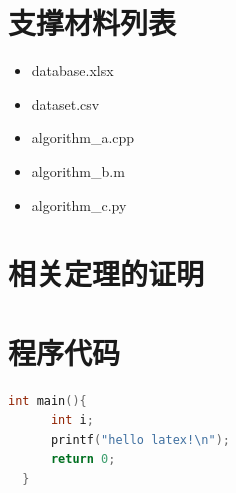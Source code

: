 
\begin{appendices}

\section{支撑材料列表}

\begin{itemize}\ttfamily
  \item{database.xlsx}
  \item{dataset.csv}
  \item{algorithm\_a.cpp}
  \item{algorithm\_b.m}
  \item{algorithm\_c.py}
\end{itemize}



\section{相关定理的证明}

\zhlipsum[2]


\section{程序代码}


\begin{lstlisting}[language=C++,title={\raggedright 基础程序}]
  int main(){
      int i;
      printf("hello latex!\n");
      return 0;
  }
\end{lstlisting}







\end{appendices}
